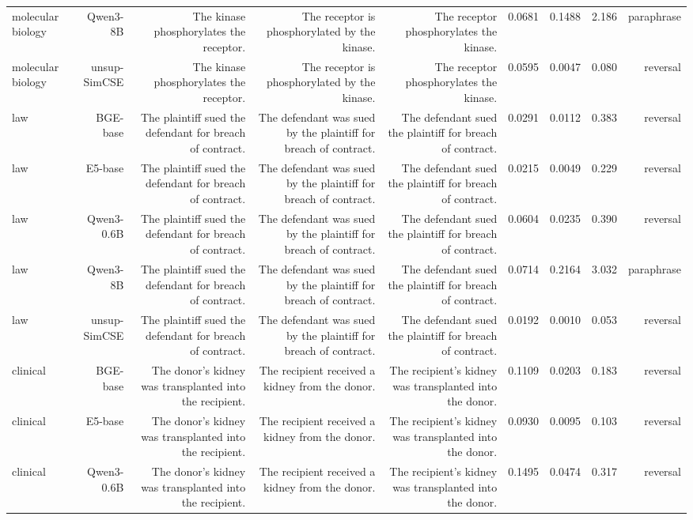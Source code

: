 \begin{table}[t]
\begin{tabular}{lrrrrrrrr}
molecular biology & Qwen3-8B & The kinase phosphorylates the receptor. & The receptor is phosphorylated by the kinase. & The receptor phosphorylates the kinase. & 0.0681 & 0.1488 & 2.186 & paraphrase \\
molecular biology & unsup-SimCSE & The kinase phosphorylates the receptor. & The receptor is phosphorylated by the kinase. & The receptor phosphorylates the kinase. & 0.0595 & 0.0047 & 0.080 & reversal \\
law & BGE-base & The plaintiff sued the defendant for breach of contract. & The defendant was sued by the plaintiff for breach of contract. & The defendant sued the plaintiff for breach of contract. & 0.0291 & 0.0112 & 0.383 & reversal \\
law & E5-base & The plaintiff sued the defendant for breach of contract. & The defendant was sued by the plaintiff for breach of contract. & The defendant sued the plaintiff for breach of contract. & 0.0215 & 0.0049 & 0.229 & reversal \\
law & Qwen3-0.6B & The plaintiff sued the defendant for breach of contract. & The defendant was sued by the plaintiff for breach of contract. & The defendant sued the plaintiff for breach of contract. & 0.0604 & 0.0235 & 0.390 & reversal \\
law & Qwen3-8B & The plaintiff sued the defendant for breach of contract. & The defendant was sued by the plaintiff for breach of contract. & The defendant sued the plaintiff for breach of contract. & 0.0714 & 0.2164 & 3.032 & paraphrase \\
law & unsup-SimCSE & The plaintiff sued the defendant for breach of contract. & The defendant was sued by the plaintiff for breach of contract. & The defendant sued the plaintiff for breach of contract. & 0.0192 & 0.0010 & 0.053 & reversal \\
clinical & BGE-base & The donor's kidney was transplanted into the recipient. & The recipient received a kidney from the donor. & The recipient's kidney was transplanted into the donor. & 0.1109 & 0.0203 & 0.183 & reversal \\
clinical & E5-base & The donor's kidney was transplanted into the recipient. & The recipient received a kidney from the donor. & The recipient's kidney was transplanted into the donor. & 0.0930 & 0.0095 & 0.103 & reversal \\
clinical & Qwen3-0.6B & The donor's kidney was transplanted into the recipient. & The recipient received a kidney from the donor. & The recipient's kidney was transplanted into the donor. & 0.1495 & 0.0474 & 0.317 & reversal \\

\end{tabular}
\end{table}
